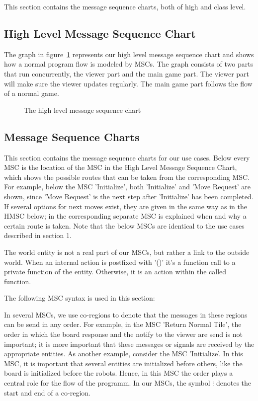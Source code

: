 This section contains the message sequence charts, both of high and class level.
\subsection{High Level Message Sequence Chart}
	The graph in figure~\ref{fig:msc:high} represents our high level message sequence chart and shows how a normal program flow is modeled by MSCs. The graph consists of two parts that run concurrently, the viewer part and the main game part. The viewer part will make sure the viewer updates regularly. The main game part follows the flow of a normal game.
	
	\begin{figure}[h]
		
		\label{fig:msc:high}
		\caption{The high level message sequence chart}
	\end{figure}

\subsection{Message Sequence Charts}
	This section contains the message sequence charts for our use cases. Below every MSC is the location of the MSC in the High Level Message Sequence Chart, which shows the possible routes that can be taken from the corresponding MSC. For example, below the MSC 'Initialize', both 'Initialize' and 'Move Request' are shown, since 'Move Request' is the next step after 'Initialize' has been completed. If several options for next moves exist, they are given in the same way as in the HMSC below; in the corresponding separate MSC is explained when and why a certain route is taken. Note that the below MSCs are identical to the use cases described in section 1.

	The world entity is not a real part of our MSCs, but rather a link to the outside world. When an internal action is postfixed with '()' it's a function call to a private function of the entity. Otherwise, it is an action within the called function.

	The following MSC syntax is used in this section:

	

	In several MSCs, we use co-regions to denote that the messages in these regions can be send in any order. For example, in the MSC 'Return Normal Tile', the order in which the board response and the notify to the viewer are send is not important; it is more important that these messages or signals are received by the appropriate entities. As another example, consider the MSC 'Initialize'. In this MSC, it is important that several entities are initialized before others, like the board is initialized before the robots. Hence, in this MSC the order plays a central role for the flow of the programm. In our MSCs, the symbol $\vdots$ denotes the start and end of a co-region.

